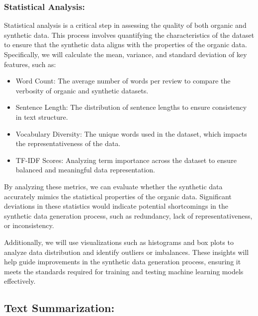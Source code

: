 \documentclass[sigplan,screen]{acmart}
\begin{document}
\subsubsection{Statistical Analysis:}
Statistical analysis is a critical step in assessing the quality of both organic and synthetic data. This process involves quantifying the characteristics of the dataset to ensure that the synthetic data aligns with the properties of the organic data. Specifically, we will calculate the mean, variance, and standard deviation of key features, such as:

\begin{itemize}
    \item Word Count: The average number of words per review to compare the verbosity of organic and synthetic datasets.
    \item Sentence Length: The distribution of sentence lengths to ensure consistency in text structure.
    \item Vocabulary Diversity: The unique words used in the dataset, which impacts the representativeness of the data.
    \item TF-IDF Scores: Analyzing term importance across the dataset to ensure balanced and meaningful data representation.

\end{itemize}

By analyzing these metrics, we can evaluate whether the synthetic data accurately mimics the statistical properties of the organic data. Significant deviations in these statistics would indicate potential shortcomings in the synthetic data generation process, such as redundancy, lack of representativeness, or inconsistency.

Additionally, we will use visualizations such as histograms and box plots to analyze data distribution and identify outliers or imbalances. These insights will help guide improvements in the synthetic data generation process, ensuring it meets the standards required for training and testing machine learning models effectively.

\subsection{Text Summarization:}
\end{document}
